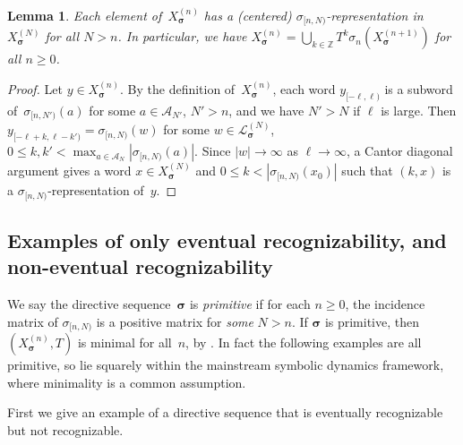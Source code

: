\documentclass{amsart}
\newtheorem{lemma}{Lemma}[section]
\theoremstyle{definition}
\theoremstyle{remark}
\numberwithin{equation}{section}
\begin{document}
\begin{lemma} \label{at_least_one}
Each element of~$X_{\boldsymbol{\sigma}}^{(n)}$ has a (centered) $\sigma_{[n,N)}$-representation in~$X_{\boldsymbol{\sigma}}^{(N)}$ for all $N > n$. 
In particular, we have $X_{\boldsymbol{\sigma}}^{(n)} = \bigcup_{k\in\mathbb{Z}} T^k \sigma_n(X_{\boldsymbol{\sigma}}^{(n+1)})$ for all $n \ge 0$.  
\end{lemma}

\begin{proof}
Let $y \in X_{\boldsymbol{\sigma}}^{(n)}$.
By the definition of~$X_{\boldsymbol{\sigma}}^{(n)}$, each word $y_{[-\ell,\ell)}$ is a subword of~$\sigma_{[n,N')}(a)$ for some $a \in \mathcal{A}_{N'}$, $N'> n$, and we have $N' > N$ if $\ell$ is large.
Then $y_{[-\ell+k,\ell-k')} = \sigma_{[n,N)}(w)$ for some $w \in \mathcal{L}_{\boldsymbol{\sigma}}^{(N)}$, $0 \le k,k' < \max_{a\in\mathcal{A}_N} |\sigma_{[n,N)}(a)|$.
Since $|w| \to \infty$ as $\ell \to \infty$, a Cantor diagonal argument gives a word $x \in X_{\boldsymbol{\sigma}}^{(N)}$ and $0 \le k < |\sigma_{[n,N)}(x_0)|$ such that $(k,x)$ is a $\sigma_{[n,N)}$-representation of~$y$.
\end{proof}


\subsection{Examples of only eventual recognizability, and non-eventual recognizability}\label{examples}




 We say the directive sequence~$\boldsymbol{\sigma}$ is \emph{primitive} if for each $n\ge0$, the incidence matrix of $\sigma_{[n,N)}$ is a positive matrix for \emph{some} $N> n$.
If $\boldsymbol{\sigma}$ is primitive, then $(X_{\boldsymbol{\sigma}}^{(n)},T)$ is minimal for all~$n$, by \cite[Lemma~5.2]{Berthe-Delecroix}. In fact the following examples are all primitive, so lie squarely within the mainstream symbolic dynamics framework, where minimality is a common assumption.

First we give an example of a directive sequence that is eventually recognizable but not  recognizable. 
\end{document}
